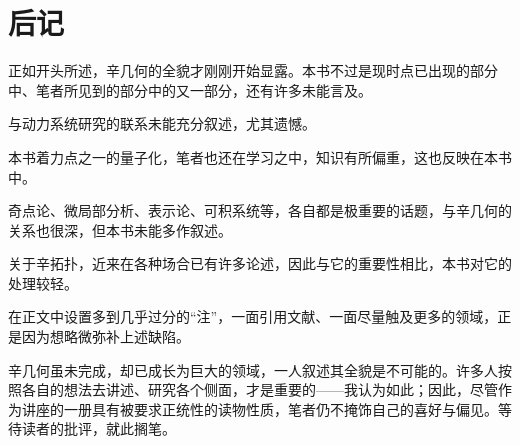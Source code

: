 \chapter*{后记}

正如开头所述，辛几何的全貌才刚刚开始显露。本书不过是现时点已出现的部分中、笔者所见到的部分中的又一部分，还有许多未能言及。

与动力系统研究的联系未能充分叙述，尤其遗憾。

本书着力点之一的量子化，笔者也还在学习之中，知识有所偏重，这也反映在本书中。

奇点论、微局部分析、表示论、可积系统等，各自都是极重要的话题，与辛几何的关系也很深，但本书未能多作叙述。

关于辛拓扑，近来在各种场合已有许多论述，因此与它的重要性相比，本书对它的处理较轻。

在正文中设置多到几乎过分的“注”，一面引用文献、一面尽量触及更多的领域，正是因为想略微弥补上述缺陷。

辛几何虽未完成，却已成长为巨大的领域，一人叙述其全貌是不可能的。许多人按照各自的想法去讲述、研究各个侧面，才是重要的——我认为如此；因此，尽管作为讲座的一册具有被要求正统性的读物性质，笔者仍不掩饰自己的喜好与偏见。等待读者的批评，就此搁笔。
